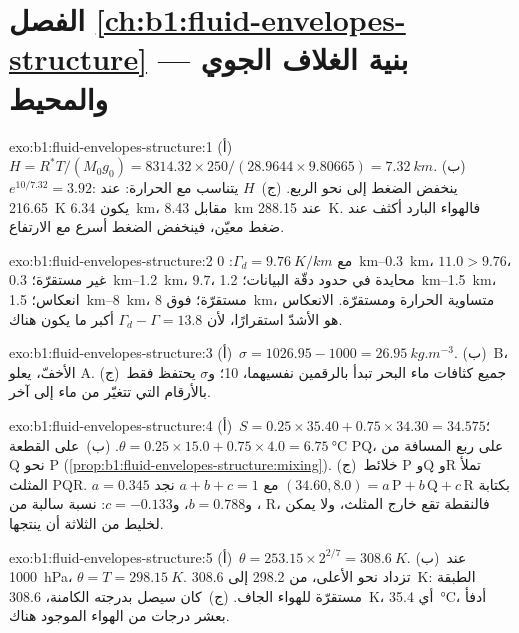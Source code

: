 \section*{الفصل \ref{ch:b1:fluid-envelopes-structure} --- بنية الغلاف الجوي والمحيط}

\begin{solution}{exo:b1:fluid-envelopes-structure:1}
(أ)~$H = R^*T/(M_0 g_0) = 8314.32 \times 250/(28.9644 \times 9.80665) =
\qty{7.32}{km}$. (ب)~$e^{10/7.32} = 3.92$: ينخفض الضغط إلى نحو الربع. (ج)~$H$ يتناسب مع الحرارة: عند \qty{216.65}{K} يكون \qty{6.34}{km}، مقابل \qty{8.43}{km} عند \qty{288.15}{K}. فالهواء البارد أكثف عند ضغط معيّن، فينخفض الضغط أسرع مع الارتفاع.
\end{solution}

\begin{solution}{exo:b1:fluid-envelopes-structure:2}
مع $\Gamma_d = \qty{9.76}{K/km}$: \qtyrange{0}{0.3}{km}، $11.0 > 9.76$،
غير مستقرّة؛ \qtyrange{0.3}{1.2}{km}، $9.7$، محايدة في حدود دقّة البيانات؛ \qtyrange{1.2}{1.5}{km}، انعكاس؛ \qtyrange{1.5}{8}{km}، مستقرّة؛
فوق \qty{8}{km}، متساوية الحرارة ومستقرّة. الانعكاس هو الأشدّ استقرارًا، لأن $\Gamma_d - \Gamma = 13.8$ أكبر ما يكون هناك.
\end{solution}

\begin{solution}{exo:b1:fluid-envelopes-structure:3}
(أ)~$\sigma = 1026.95 - 1000 = \qty{26.95}{kg.m^{-3}}$. (ب)~B، الأخفّ، يعلو A. (ج)~جميع كثافات ماء البحر تبدأ بالرقمين نفسيهما، 10؛ و$\sigma$ يحتفظ فقط بالأرقام التي تتغيّر من ماء إلى آخر.
\end{solution}

\begin{solution}{exo:b1:fluid-envelopes-structure:4}
(أ)~$S = 0.25 \times 35.40 + 0.75 \times 34.30 = 34.575$؛ $\theta = 0.25 \times
15.0 + 0.75 \times 4.0 = \qty{6.75}{\celsius}$. (ب)~على القطعة PQ، على ربع المسافة من Q نحو P (\cref{prop:b1:fluid-envelopes-structure:mixing}).
(ج)~خلائط P وQ وR تملأ المثلث PQR. بكتابة $(34.60, 8.0) = a\,\mathrm P + b\,\mathrm Q + c\,\mathrm R$ مع $a + b + c = 1$
نجد $a = 0.345$، و$b = 0.788$، و$c = -0.133$: نسبة سالبة من R، فالنقطة تقع خارج المثلث، ولا يمكن لخليط من الثلاثة أن ينتجها.
\end{solution}

\begin{solution}{exo:b1:fluid-envelopes-structure:5}
(أ)~$\theta = 253.15 \times 2^{2/7} = \qty{308.6}{K}$. (ب)~عند \qty{1000}{hPa}،
$\theta = T = \qty{298.15}{K}$. تزداد  نحو الأعلى، من 298.2 إلى \qty{308.6}{K}: الطبقة مستقرّة للهواء الجاف. (ج)~كان سيصل بدرجته الكامنة، \qty{308.6}{K}، أي \qty{35.4}{\celsius}، أدفأ بعشر درجات من الهواء الموجود هناك.
\end{solution}

